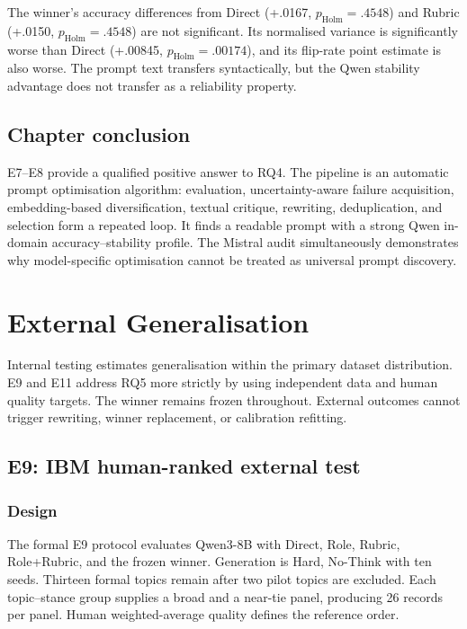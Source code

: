 \documentclass[11pt,twoside,a4paper]{report}
\newcommand{\holmp}{\ensuremath{p_{\mathrm{Holm}}}}
\begin{document}
The winner's accuracy differences from Direct (+.0167, $\holmp=.4548$) and Rubric
(+.0150, $\holmp=.4548$) are not significant.  Its normalised variance is
significantly worse than Direct (+.00845, $\holmp=.00174$), and its flip-rate point
estimate is also worse.  The prompt text transfers syntactically, but the Qwen
stability advantage does not transfer as a reliability property.

\section{Chapter conclusion}

E7--E8 provide a qualified positive answer to RQ4.  The pipeline is an automatic
prompt optimisation algorithm: evaluation, uncertainty-aware failure acquisition,
embedding-based diversification, textual critique, rewriting, deduplication, and
selection form a repeated loop.  It finds a readable prompt with a strong Qwen
in-domain accuracy--stability profile.  The Mistral audit simultaneously demonstrates
why model-specific optimisation cannot be treated as universal prompt discovery.

\chapter{External Generalisation}
\label{chap:external}

Internal testing estimates generalisation within the primary dataset distribution.
E9 and E11 address RQ5 more strictly by using independent data and human quality
targets.  The winner remains frozen throughout.  External outcomes cannot trigger
rewriting, winner replacement, or calibration refitting.

\section{E9: IBM human-ranked external test}
\label{sec:e9}

\subsection{Design}

The formal E9 protocol evaluates Qwen3-8B with Direct, Role, Rubric, Role+Rubric, and
the frozen winner.  Generation is Hard, No-Think with ten seeds.  Thirteen formal
topics remain after two pilot topics are excluded.  Each topic--stance group supplies
a broad and a near-tie panel, producing 26 records per panel.  Human weighted-average
quality defines the reference order.
\end{document}
